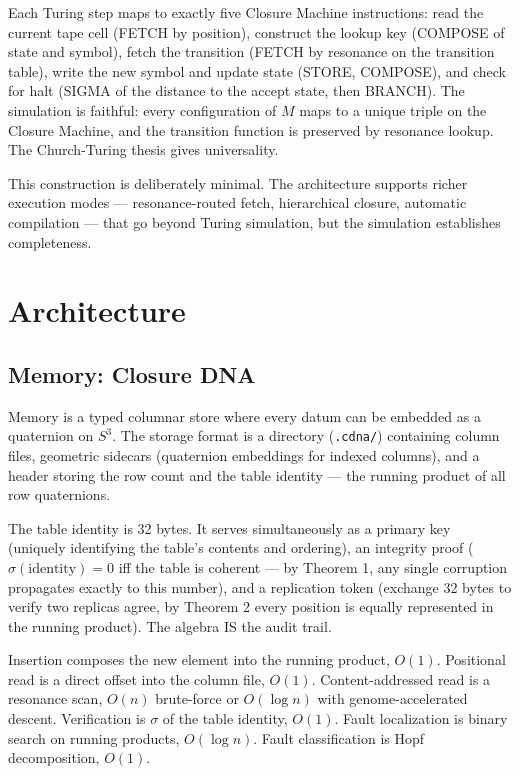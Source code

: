 \documentclass[12pt,a4paper]{article}
\begin{document}
Each Turing step maps to exactly five Closure Machine instructions: read the current tape cell (FETCH by position), construct the lookup key (COMPOSE of state and symbol), fetch the transition (FETCH by resonance on the transition table), write the new symbol and update state (STORE, COMPOSE), and check for halt (SIGMA of the distance to the accept state, then BRANCH). The simulation is faithful: every configuration of $M$ maps to a unique triple on the Closure Machine, and the transition function is preserved by resonance lookup. The Church-Turing thesis \cite{turing1936, church1936} gives universality.

This construction is deliberately minimal. The architecture supports richer execution modes --- resonance-routed fetch, hierarchical closure, automatic compilation --- that go beyond Turing simulation, but the simulation establishes completeness.


\section{Architecture}

\subsection{Memory: Closure DNA}

Memory is a typed columnar store where every datum can be embedded as a quaternion on $S^3$. The storage format is a directory (\texttt{.cdna/}) containing column files, geometric sidecars (quaternion embeddings for indexed columns), and a header storing the row count and the table identity --- the running product of all row quaternions.

The table identity is 32 bytes. It serves simultaneously as a primary key (uniquely identifying the table's contents and ordering), an integrity proof ($\sigma(\text{identity}) = 0$ iff the table is coherent --- by Theorem 1, any single corruption propagates exactly to this number), and a replication token (exchange 32 bytes to verify two replicas agree, by Theorem 2 every position is equally represented in the running product). The algebra IS the audit trail.

Insertion composes the new element into the running product, $O(1)$. Positional read is a direct offset into the column file, $O(1)$. Content-addressed read is a resonance scan, $O(n)$ brute-force or $O(\log n)$ with genome-accelerated descent. Verification is $\sigma$ of the table identity, $O(1)$. Fault localization is binary search on running products, $O(\log n)$. Fault classification is Hopf decomposition, $O(1)$.
\end{document}
